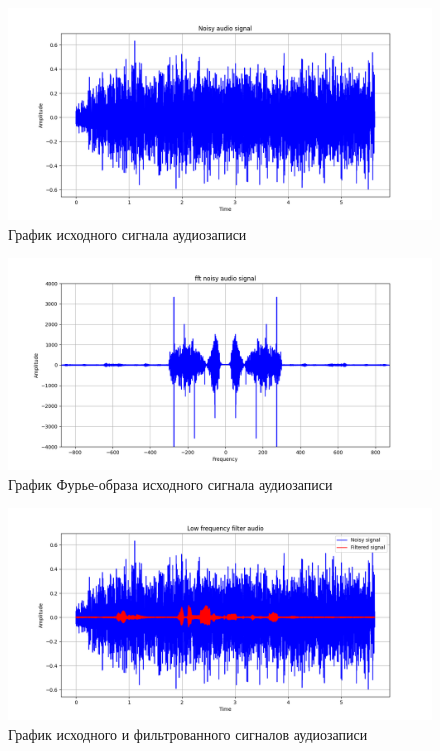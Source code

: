 \documentclass[a4paper, 12pt]{article}
\begin{document}
    \begin{figure}[!htb]
        \centering
        \includegraphics[scale=0.485]{noisy_audio.png}
        \captionsetup{skip=0pt}
        \caption{График исходного сигнала аудиозаписи}
        \label{fig:fig111}
    \end{figure}
    \begin{figure}[!htb]
        \centering
        \includegraphics[scale=0.485]{U_audio.png}
        \captionsetup{skip=0pt}
        \caption{График Фурье-образа исходного сигнала аудиозаписи}
        \label{fig:fig112}
    \end{figure}
    \begin{figure}[!htb]
        \centering
        \includegraphics[scale=0.485]{u_flt_u_audio.png}
        \captionsetup{skip=0pt}
        \caption{График исходного и фильтрованного сигналов аудиозаписи}
        \label{fig:fig113}
    \end{figure}
\end{document}
